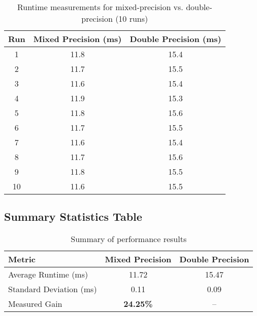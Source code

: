 \documentclass[12pt, titlepage]{article}
\begin{document}
\begin{table}[H]
  \centering
  \caption{Runtime measurements for mixed-precision vs. double-precision (10 runs)}
  \begin{tabular}{c|c|c}
    \toprule
    \textbf{Run} & \textbf{Mixed Precision (ms)} & \textbf{Double Precision (ms)} \\
    \midrule
    1      & 11.8                    & 15.4                     \\
    2      & 11.7                    & 15.5                     \\
    3      & 11.6                    & 15.4                     \\
    4      & 11.9                    & 15.3                     \\
    5      & 11.8                    & 15.6                     \\
    6      & 11.7                    & 15.5                     \\
    7      & 11.6                    & 15.4                     \\
    8      & 11.7                    & 15.6                     \\
    9      & 11.8                    & 15.5                     \\
    10     & 11.6                    & 15.5                     \\
    \bottomrule
  \end{tabular}
  \label{tab:perf-raw}
\end{table}

\subsection{Summary Statistics Table}

\begin{table}[H]
  \centering
  \caption{Summary of performance results}
  \begin{tabular}{l|c|c}
    \toprule
    \textbf{Metric}               & \textbf{Mixed Precision} & \textbf{Double Precision} \\
    \midrule
    Average Runtime (ms)    & 11.72              & 15.47               \\
    Standard Deviation (ms) & 0.11               & 0.09                \\
    Measured Gain           & \textbf{24.25\%}         & --                  \\
    \bottomrule
  \end{tabular}
  \label{tab:perf-summary}
\end{table}
\end{document}

